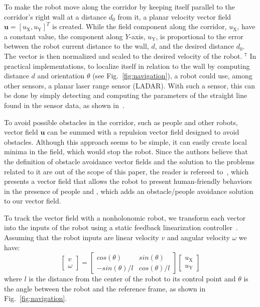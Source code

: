 \documentclass[smallcondensed]{svjour3}
\begin{document}
To make the robot move along the corridor by keeping itself parallel to the corridor's right wall at a distance $d_0$ from it, a planar velocity vector field $\mathbf{u}=[u_\text{X}, u_\text{Y}]^T$ is created. While the field component along the corridor, $u_\text{X}$,  have a constant value, the component along $Y$-axis,  $u_\text{Y}$, is proportional to the error between the robot current distance to the wall, $d$, and the desired distance $d_\text{0}$. The vector is then normalized and scaled to the desired velocity of the robot. {\color{blue} $^7$ In practical implementations, to localize itself in relation to the wall by computing distance $d$ and orientation $\theta$ (see Fig.~\ref{fig:navigation}), a robot could use, among other sensors, a planar laser range sensor (LADAR). With such a sensor, this can be done by simply detecting and computing the parameters of the straight line found in the sensor data, as shown in~\cite{Arthur2015}}.

To avoid possible obstacles in the corridor, such as people and other robots, vector field $\mathbf{u}$ can be summed with a repulsion vector field designed to avoid obstacles. Although this approach seems to be simple, it can easily create local minima in the field, which would stop the robot. Since the authors believe that the definition of obstacle avoidance vector fields and the solution to the problems related to it are out of the scope of this paper, the reader is refereed to~\cite{lam2011human}, which presents a vector field that allows the robot to present human-friendly behaviors in the presence of people and \cite{Arthur2015}, which adds an obstacle/people avoidance solution to our vector field.

To track the vector field with a nonholonomic robot, we transform each vector into the inputs of the robot using a static feedback linearization controller~\citep{d1995control}. Assuming that the robot inputs are linear velocity $v$ and angular velocity $\omega$ we have:
%
\begin{equation}
    \begin{bmatrix} v \\ \omega \end{bmatrix} = \begin{bmatrix} cos(\theta) & sin (\theta) \\ -sin (\theta)/l & cos (\theta)/l \end{bmatrix} 		\begin{bmatrix} u_\text{X} \\ u_\text{Y} \end{bmatrix} 
    \label{eq:transformation}
\end{equation}
%
where $l$ is the distance from the center of the robot to its control point and $\theta$ is the angle between the robot and the reference frame, as shown in Fig.~\ref{fig:navigation}.
\end{document}
